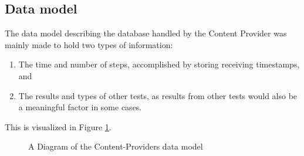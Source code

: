 \subsection{Data model}
The data model describing the database handled by the Content Provider was mainly made to hold two types of information: 
\begin{enumerate}
\item The time and number of steps, accomplished by storing receiving timestamps, and
\item The results and types of other tests, as results from other tests would also be a meaningful factor in some cases.
\end{enumerate}
This is visualized in Figure \ref{fig:CPDataModel}.

\begin{figure}[p]

\caption{A Diagram of the Content-Providers data model}
\label{fig:CPDataModel}

\setlength\fboxsep{0pt}
\setlength\fboxrule{1pt}

\end{figure}